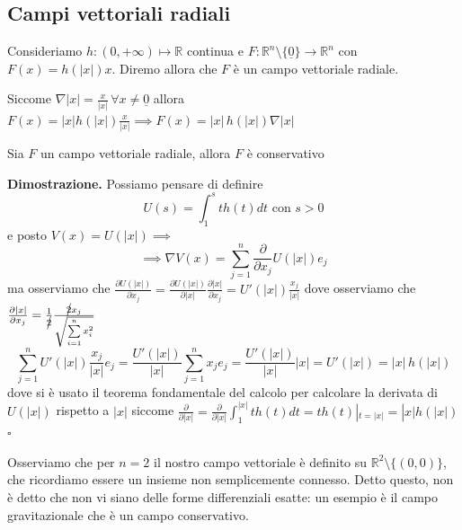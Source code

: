 \vspace{0.5cm}
\subsection{Campi vettoriali radiali}

\begin{definition}[\textcolor{blue}{campo vettoriale radiale}]
	Consideriamo $h: (0, +\infty) \mapsto \mathbb{R}$ continua e $F: \mathbb{R}^n \setminus \{\underline{0} \} \to \mathbb{R}^n$ con $F(x) = h(|x|)x$.
	Diremo allora che $F$ è un campo vettoriale radiale.
\end{definition}

\begin{remark}
Siccome $\nabla |x| = \frac{x}{|x|} \, \forall x \neq \underline{0}$ allora $F(x) = |x|h(|x|)\frac{x}{|x|} \implies F(x) = |x| \, h(|x|)\nabla |x|$
\end{remark}

\vspace{0.5cm}
\begin{prop}[\textcolor{blue}{i campi radiali sono conservativi}]
	Sia $F$ un campo vettoriale radiale, allora $F$ è conservativo
\end{prop}

\noindent \textbf{Dimostrazione. }
	Possiamo pensare di definire
	$$
	U(s) = \int_1^s t h(t)dt \text{ con } s > 0 
	$$
	e posto $V(x) = U(|x|) \implies$
	$$
	\implies \nabla V(x) = \sum_{j=1}^n \frac{\partial}{\partial x_j} U(|x|)e_j
	$$
	ma osserviamo che $\frac{\partial U(|x|)}{\partial x_j} = \frac{\partial U(|x|)}{\partial |x|} \frac{\partial |x|}{\partial x_j} = U'(|x|) \frac{x_j}{|x|}$ dove osserviamo che $\frac{\partial |x|}{\partial x_j} = \frac{1}{\cancel{2}} \frac{\cancel{2}x_j}{\sqrt{\sum\limits_{i=1}^n x_i^2}}$
	$$
		\sum_{j=1}^n U'(|x|) \frac{x_j}{|x|}e_j = \frac{U'(|x|)}{|x|} \sum_{j=1}^n x_j e_j = \frac{U'(|x|)}{|x|} |x| = U'(|x|) = |x| \, h(|x|)
	$$
	dove si è usato il teorema fondamentale del calcolo per calcolare la derivata di $U(|x|)$ rispetto a $|x|$ siccome $\frac{\partial}{\partial |x|} = \frac{\partial}{\partial |x|} \int_1^{|x|} t h(t) dt = th(t)|_{t=|x|} = |x|h(|x|)$
\hfill $\square$

\begin{remark}
	Osserviamo che per $n=2$ il nostro campo vettoriale è definito su $\mathbb{R}^2 \setminus \{ (0, 0) \}$, che ricordiamo essere un insieme non semplicemente connesso. Detto questo, non è detto che non vi siano delle forme differenziali esatte: un esempio
	è il campo gravitazionale che è un campo conservativo.
\end{remark}

